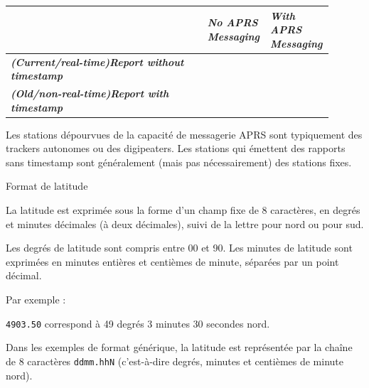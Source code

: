 \begin{aprsbodyblock}
{\small
\setlength{\arrayrulewidth}{0.75pt}
\setlength{\tabcolsep}{4pt}
\renewcommand{\arraystretch}{1.3}
\noindent\hfill
\begin{tabular}{@{}|>{\bfseries\itshape}p{0.60\linewidth}|>{\centering\arraybackslash}p{0.15\linewidth}|>{\centering\arraybackslash}p{0.15\linewidth}|@{}}
\hhline{~--}
\multicolumn{1}{c|}{} & \cellcolor{gray!20}\bfseries\itshape No APRS Messaging & \cellcolor{gray!20}\bfseries\itshape With APRS Messaging \\
\hline
 \cellcolor{gray!20}(Current/real-time)\hfill Report without timestamp & \lit{!} & \lit{=} \\
\hline
 \cellcolor{gray!20}(Old/non-real-time)\hfill Report with timestamp & \lit{/} & \lit{@} \\
\hline
\end{tabular}
}
\end{aprsbodyblock}

\begin{aprsbodyblock}
Les stations dépourvues de la capacité de messagerie APRS sont
typiquement des trackers autonomes ou des digipeaters. Les stations qui
émettent des rapports sans timestamp sont généralement (mais pas
nécessairement) des stations fixes.
\end{aprsbodyblock}

\begin{aprssideblock}{Format de latitude}
\label{format-de-latitude}
La latitude est exprimée sous la forme d'un champ fixe de 8 caractères,
en degrés et minutes décimales (à deux décimales), suivi de la lettre
 pour nord ou  pour sud.

Les degrés de latitude sont compris entre 00 et 90. Les minutes de
latitude sont exprimées en minutes entières et centièmes de minute,
séparées par un point décimal.

Par exemple :

\begin{aprsexample}
\texttt{4903.50} \exgap correspond à 49 degrés 3 minutes
30 secondes nord.
\end{aprsexample}

Dans les exemples de format générique, la latitude est représentée par
la chaîne de 8 caractères \texttt{ddmm.hhN} (c'est-à-dire degrés,
minutes et centièmes de minute nord).
\end{aprssideblock}

